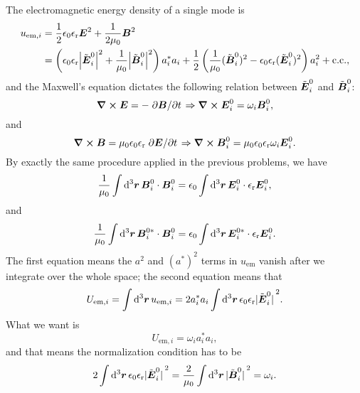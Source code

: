 \documentclass[hyperref, a4paper]{article}
\newcommand{\epsr}{\epsilon_{\text{r}}}
\newcommand*{\mvb}[1]{\tilde{\vb*{#1}}}
\begin{document}
The electromagnetic energy density of a single mode is 
\begin{equation}
    \begin{aligned}    
        u_{\text{em}, i} &= \frac{1}{2} \epsilon_0 \epsr \vb*{E}^2 + \frac{1}{2 \mu_0} \vb*{B}^2 \\
        &= \left(\epsilon_0 \epsr \abs{\mvb{E}_i^0}^2 + \frac{1}{\mu_0} \abs{\mvb{B}_i^0}^2\right) a_i^* a_i 
        + \frac{1}{2} \left( \frac{1}{\mu_0} (\mvb{B}_i^{0})^2 - \epsilon_0 \epsr (\mvb{E}_i^0)^2 \right) a_i^2 + \text{c.c.}, 
    \end{aligned}
\end{equation}
and the Maxwell's equation dictates the following relation between $\mvb{E}_i^0$ and $\mvb{B}_i^0$: 
\begin{equation}
    \curl{\vb*{E}} = - \pdv*{\vb*{B}}{t} \Rightarrow 
    \curl{\vb*{E}_i^0} = \omega_i \vb*{B}_i^0,
\end{equation}
and 
\begin{equation}
    \curl{\vb*{B}} = \mu_0 \epsilon_0 \epsr \pdv*{\vb*{E}}{t} \Rightarrow
    \curl{\vb*{B}_i^0} = \mu_0 \epsilon_0 \epsr \omega_i \vb*{E}_i^0.
\end{equation}
By exactly the same procedure applied in the previous problems, we have 
\begin{equation}
    \frac{1}{\mu_0} \int \dd[3]{\vb*{r}} \vb*{B}_i^0 \cdot \vb*{B}_i^0 = 
    \epsilon_0 \int \dd[3]{\vb*{r}} \vb*{E}_i^0 \cdot \epsr \vb*{E}_i^0, 
\end{equation}
and 
\begin{equation}
    \frac{1}{\mu_0} \int \dd[3]{\vb*{r}} \vb*{B}_i^{0*} \cdot \vb*{B}_i^0 = 
    \epsilon_0 \int \dd[3]{\vb*{r}} \vb*{E}_i^{0*} \cdot \epsr \vb*{E}_i^0.
\end{equation}
The first equation means the $a^2$ and $(a^*)^2$ terms in $u_{\text{em}}$
vanish after we integrate over the whole space; 
the second equation means that 
\begin{equation}
    U_{\text{em}, i} = \int \dd[3]{\vb*{r}} u_{\text{em}, i}
    = 2 a_i^* a_i \int \dd[3]{\vb*{r}} \epsilon_0 \epsr \abs*{\mvb{E}_i^0}^2.
\end{equation}
What we want is 
\begin{equation}
    U_{\text{em}, i} = \omega_i a^*_i a_i, 
\end{equation}
and that means the normalization condition has to be 
\begin{equation}
    2 \int \dd[3]{\vb*{r}} \epsilon_0 \epsr \abs*{\mvb{E}_i^0}^2 = \frac{2}{\mu_0} \int \dd[3]{\vb*{r}} \abs*{\mvb{B}_i^0}^2 = \omega_i.
\end{equation}
\end{document}
